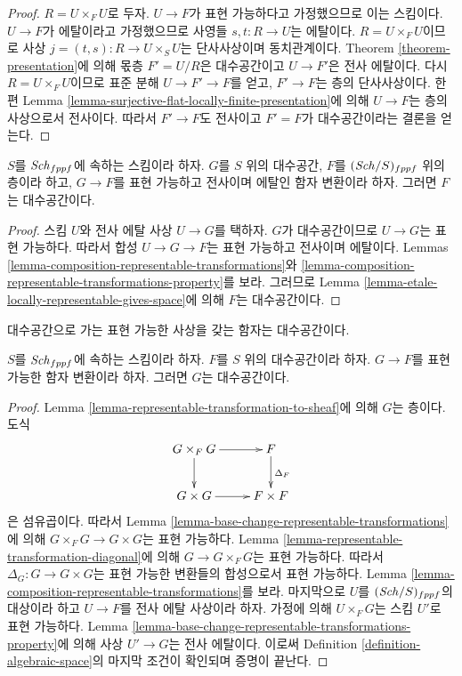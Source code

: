 \begin{proof}
$R = U \times_F U$로 두자. $U \to F$가 표현 가능하다고 가정했으므로
이는 스킴이다. $U \to F$가 에탈이라고 가정했으므로 사영들
$s, t : R \to U$는 에탈이다. $R = U \times_F U$이므로 사상
$j = (t, s) : R \to U \times_S U$는 단사사상이며 동치관계이다.
Theorem \ref{theorem-presentation}에 의해 몫층 $F' = U/R$은
대수공간이고 $U \to F'$은 전사 에탈이다. 다시 $R = U \times_F U$이므로
표준 분해 $U \to F' \to F$를 얻고, $F' \to F$는 층의 단사사상이다.
한편 Lemma \ref{lemma-surjective-flat-locally-finite-presentation}에
의해 $U \to F$는 층의 사상으로서 전사이다. 따라서 $F' \to F$도
전사이고 $F' = F$가 대수공간이라는 결론을 얻는다.
\end{proof}

\begin{lemma}
\label{lemma-etale-locally-representable-by-space-gives-space}
$S$를 $\mathit{Sch}_{fppf}$에 속하는 스킴이라 하자. $G$를 $S$ 위의
대수공간, $F$를 $(\mathit{Sch}/S)_{fppf}$ 위의 층이라 하고,
$G \to F$를 표현 가능하고 전사이며 에탈인 함자 변환이라 하자.
그러면 $F$는 대수공간이다.
\end{lemma}

\begin{proof}
스킴 $U$와 전사 에탈 사상 $U \to G$를 택하자.
$G$가 대수공간이므로 $U \to G$는 표현 가능하다.
따라서 합성 $U \to G \to F$는 표현 가능하고 전사이며 에탈이다.
Lemmas \ref{lemma-composition-representable-transformations}와
\ref{lemma-composition-representable-transformations-property}를
보라. 그러므로 Lemma
\ref{lemma-etale-locally-representable-gives-space}에 의해 $F$는
대수공간이다.
\end{proof}

\begin{lemma}
\label{lemma-representable-over-space}
\begin{slogan}
대수공간으로 가는 표현 가능한 사상을 갖는 함자는 대수공간이다.
\end{slogan}
$S$를 $\mathit{Sch}_{fppf}$에 속하는 스킴이라 하자.
$F$를 $S$ 위의 대수공간이라 하자.
$G \to F$를 표현 가능한 함자 변환이라 하자.
그러면 $G$는 대수공간이다.
\end{lemma}

\begin{proof}
Lemma \ref{lemma-representable-transformation-to-sheaf}에 의해
$G$는 층이다. 도식
$$
\xymatrix{
G \times_F G \ar[r] \ar[d] & F \ar[d]^{\Delta_F} \\
G \times G \ar[r] & F \times F
}
$$
은 섬유곱이다. 따라서 Lemma
\ref{lemma-base-change-representable-transformations}에 의해
$G \times_F G \to G \times G$는 표현 가능하다.
Lemma \ref{lemma-representable-transformation-diagonal}에 의해
$G \to G \times_F G$는 표현 가능하다. 따라서 $\Delta_G : G \to G \times G$는
표현 가능한 변환들의 합성으로서 표현 가능하다. Lemma
\ref{lemma-composition-representable-transformations}를 보라.
마지막으로 $U$를 $(\mathit{Sch}/S)_{fppf}$의 대상이라 하고
$U \to F$를 전사 에탈 사상이라 하자. 가정에 의해
$U \times_F G$는 스킴 $U'$로 표현 가능하다. Lemma
\ref{lemma-base-change-representable-transformations-property}에 의해
사상 $U' \to G$는 전사 에탈이다. 이로써 Definition
\ref{definition-algebraic-space}의 마지막 조건이 확인되며 증명이 끝난다.
\end{proof}

